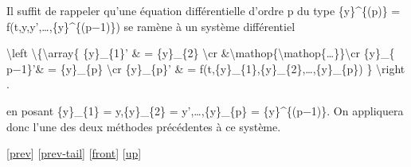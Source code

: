 \documentclass[]{article}
\begin{document}
Il suffit de rappeler qu'une équation différentielle d'ordre p du type
\{y\}\^{}\{(p)\} = f(t,y,y',\ldots{},\{y\}\^{}\{(p−1)\}) se ramène à un
système différentiel

\textbackslash{}left \textbackslash{}\{\textbackslash{}array\{
\{y\}\_\{1\}' \& = \{y\}\_\{2\} \textbackslash{}cr
\&\textbackslash{}mathop\{\textbackslash{}mathop\{\ldots{}\}\}\textbackslash{}cr
\{y\}\_\{ p−1\}'\& = \{y\}\_\{p\} \textbackslash{}cr \{y\}\_\{p\}' \& =
f(t,\{y\}\_\{1\},\{y\}\_\{2\},\ldots{},\{y\}\_\{p\}) \}
\textbackslash{}right .

en posant \{y\}\_\{1\} = y,\{y\}\_\{2\} = y',\ldots{},\{y\}\_\{p\} =
\{y\}\^{}\{(p−1)\}. On appliquera donc l'une des deux méthodes
précédentes à ce système.

{[}\href{coursse90.html}{prev}{]}
{[}\href{coursse90.html\#tailcoursse90.html}{prev-tail}{]}
{[}\href{coursse91.html}{front}{]}
{[}\href{coursch17.html\#coursse91.html}{up}{]}
\end{document}
